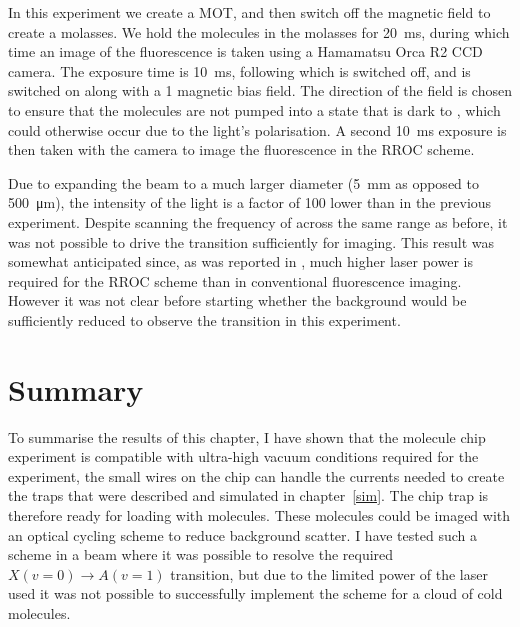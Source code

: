 In this experiment we create a MOT, and then switch off the magnetic field to
create a molasses. We hold the molecules in the molasses for
\SI{20}{\milli\second}, during which time an image of the fluorescence is taken
using a Hamamatsu Orca R2 CCD camera.
The exposure time is \SI{10}{\milli\second}, following which  is
switched off, and  is switched on along with a \SI{1}{\gauss}
magnetic bias field. The direction of the field is chosen to ensure that the
molecules are not pumped into a state that is dark to , which
could otherwise occur due to the light's polarisation. A second
\SI{10}{\milli\second} exposure is then taken with the camera to image the
fluorescence in the RROC scheme.

Due to expanding the beam to a much larger diameter (\SI{5}{\milli\meter} as
opposed to \SI{500}{\micro\meter}), the intensity of the light is a factor
of 100 lower than in the previous experiment. Despite scanning the frequency of
 across the same range as before, it was not possible to drive the
transition sufficiently for imaging. This result was somewhat anticipated
since, as was reported in , much higher laser power is
required for the RROC scheme than in conventional fluorescence imaging. However
it was not clear before starting whether the background would be sufficiently
reduced to observe the transition in this experiment.

\section{Summary}

To summarise the results of this chapter, I have shown that the molecule chip
experiment is compatible with ultra-high vacuum conditions required for the
\CaF{} experiment, the small wires on the chip can handle the currents needed
to create the traps that were described and simulated in chapter~\ref{sim}. The
chip trap is therefore ready for loading with \CaF{} molecules. These molecules
could be imaged with an optical cycling scheme to reduce background scatter. I
have tested such a scheme in a \CaF{} beam where it was possible to resolve the
required $X(v=0)\rightarrow A(v=1)$ transition, but due to the limited power of
the laser used it was not possible to successfully implement the scheme for a
cloud of cold molecules.

